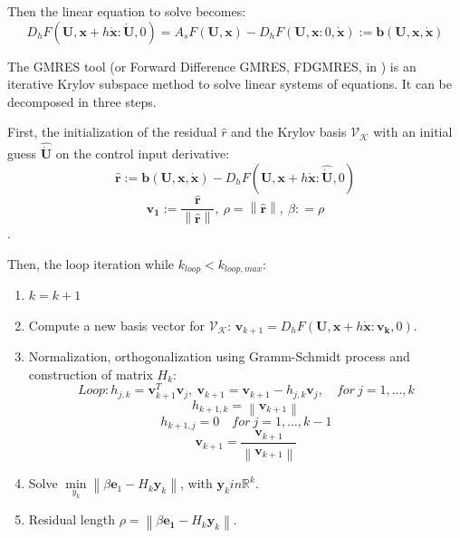 \documentclass[a4paper, 12pt]{report}
\newcommand\norm[1]{\left\lVert#1\right\rVert}
\begin{document}
Then the linear equation to solve becomes:
\[ D_h F(\boldsymbol{U}, \boldsymbol{x}+ h\boldsymbol{\dot x} : \boldsymbol{\dot U}, 0) = A_s F(\boldsymbol{U}, \boldsymbol{x}) - D_h F(\boldsymbol{U}, \boldsymbol{x} : 0, \boldsymbol{\dot x}) := \boldsymbol{b}(\boldsymbol{U}, \boldsymbol{x}, \boldsymbol{\dot x}) \]

The GMRES tool (or Forward Difference GMRES, FDGMRES, in \cite{Kelley1995}) is an iterative Krylov subspace method to solve linear systems of equations. It can be decomposed in three steps.

First, the initialization of the residual $\hat r$ and the Krylov basis $\mathcal{V}_\mathcal{K}$ with an initial guess $\boldsymbol{\hat{ \dot U}}$ on the control input derivative:
\[ \boldsymbol{\hat r} := \boldsymbol{b}(\boldsymbol{U}, \boldsymbol{x}, \boldsymbol{\dot x}) - D_h F(\boldsymbol{U}, \boldsymbol{x}+ h\boldsymbol{\dot x} : \boldsymbol{\hat{\dot U}}, 0) \]
\[\boldsymbol{v_1} := \frac{\boldsymbol{\hat r}}{\norm{\boldsymbol{\hat r}}},\ \rho = \norm{\boldsymbol{\hat r}},\ \beta: = \rho \].

Then, the loop iteration while $k_{loop} < k_{loop,max}$:
\begin{enumerate}
\item $k = k+1$
\item Compute a new basis vector for $\mathcal{V}_\mathcal{K}$: $\boldsymbol{v}_{k+1} =  D_h F(\boldsymbol{U}, \boldsymbol{x}+ h\boldsymbol{\dot x} : \boldsymbol{v_k}, 0)$.
\item Normalization, orthogonalization using Gramm-Schmidt process and construction of matrix $H_k$:
\[ Loop: h_{j,k} = \boldsymbol{v}_{k+1}^T \boldsymbol{v}_j,\ \boldsymbol{v}_{k+1} = \boldsymbol{v}_{k+1} - h_{j,k}\boldsymbol{v}_j, \quad for\ j = 1, \ldots, k \]
\[ h_{k+1,k} = \norm{\boldsymbol{v}_{k+1}} \]
\[ h_{k+1, j} =  0\quad for\ j = 1, \ldots, k-1 \]
\[ \boldsymbol{v}_{k+1} = \frac{\boldsymbol{v}_{k+1}}{\norm{\boldsymbol{v}_{k+1}}} \]
\item Solve $\min\limits_{y_k}\norm{\beta \boldsymbol{e}_1 - H_k\boldsymbol{y}_k}$, with $\boldsymbol{y}_k in \mathbb{R}^k$.
\item Residual length $\rho = \norm{\beta \boldsymbol{e_1} - H_k\boldsymbol{y}_k}$.
\end{enumerate}
\end{document}
